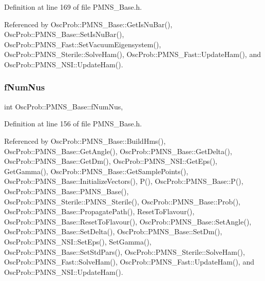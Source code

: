 Definition at line 169 of file P\+M\+N\+S\+\_\+\+Base.\+h.



Referenced by Osc\+Prob\+::\+P\+M\+N\+S\+\_\+\+Base\+::\+Get\+Is\+Nu\+Bar(), Osc\+Prob\+::\+P\+M\+N\+S\+\_\+\+Base\+::\+Set\+Is\+Nu\+Bar(), Osc\+Prob\+::\+P\+M\+N\+S\+\_\+\+Fast\+::\+Set\+Vacuum\+Eigensystem(), Osc\+Prob\+::\+P\+M\+N\+S\+\_\+\+Sterile\+::\+Solve\+Ham(), Osc\+Prob\+::\+P\+M\+N\+S\+\_\+\+Fast\+::\+Update\+Ham(), and Osc\+Prob\+::\+P\+M\+N\+S\+\_\+\+N\+S\+I\+::\+Update\+Ham().

\mbox{\label{classOscProb_1_1PMNS__Base_a24bb74bed63569dfe88b18fa6a08060e}} 
\subsubsection{\texorpdfstring{f\+Num\+Nus}{fNumNus}}
{\footnotesize\ttfamily int Osc\+Prob\+::\+P\+M\+N\+S\+\_\+\+Base\+::f\+Num\+Nus\hspace{0.3cm}{\ttfamily [protected]}, {\ttfamily [inherited]}}



Definition at line 156 of file P\+M\+N\+S\+\_\+\+Base.\+h.



Referenced by Osc\+Prob\+::\+P\+M\+N\+S\+\_\+\+Base\+::\+Build\+Hms(), Osc\+Prob\+::\+P\+M\+N\+S\+\_\+\+Base\+::\+Get\+Angle(), Osc\+Prob\+::\+P\+M\+N\+S\+\_\+\+Base\+::\+Get\+Delta(), Osc\+Prob\+::\+P\+M\+N\+S\+\_\+\+Base\+::\+Get\+Dm(), Osc\+Prob\+::\+P\+M\+N\+S\+\_\+\+N\+S\+I\+::\+Get\+Eps(), Get\+Gamma(), Osc\+Prob\+::\+P\+M\+N\+S\+\_\+\+Base\+::\+Get\+Sample\+Points(), Osc\+Prob\+::\+P\+M\+N\+S\+\_\+\+Base\+::\+Initialize\+Vectors(), P(), Osc\+Prob\+::\+P\+M\+N\+S\+\_\+\+Base\+::\+P(), Osc\+Prob\+::\+P\+M\+N\+S\+\_\+\+Base\+::\+P\+M\+N\+S\+\_\+\+Base(), Osc\+Prob\+::\+P\+M\+N\+S\+\_\+\+Sterile\+::\+P\+M\+N\+S\+\_\+\+Sterile(), Osc\+Prob\+::\+P\+M\+N\+S\+\_\+\+Base\+::\+Prob(), Osc\+Prob\+::\+P\+M\+N\+S\+\_\+\+Base\+::\+Propagate\+Path(), Reset\+To\+Flavour(), Osc\+Prob\+::\+P\+M\+N\+S\+\_\+\+Base\+::\+Reset\+To\+Flavour(), Osc\+Prob\+::\+P\+M\+N\+S\+\_\+\+Base\+::\+Set\+Angle(), Osc\+Prob\+::\+P\+M\+N\+S\+\_\+\+Base\+::\+Set\+Delta(), Osc\+Prob\+::\+P\+M\+N\+S\+\_\+\+Base\+::\+Set\+Dm(), Osc\+Prob\+::\+P\+M\+N\+S\+\_\+\+N\+S\+I\+::\+Set\+Eps(), Set\+Gamma(), Osc\+Prob\+::\+P\+M\+N\+S\+\_\+\+Base\+::\+Set\+Std\+Pars(), Osc\+Prob\+::\+P\+M\+N\+S\+\_\+\+Sterile\+::\+Solve\+Ham(), Osc\+Prob\+::\+P\+M\+N\+S\+\_\+\+Fast\+::\+Solve\+Ham(), Osc\+Prob\+::\+P\+M\+N\+S\+\_\+\+Fast\+::\+Update\+Ham(), and Osc\+Prob\+::\+P\+M\+N\+S\+\_\+\+N\+S\+I\+::\+Update\+Ham().

